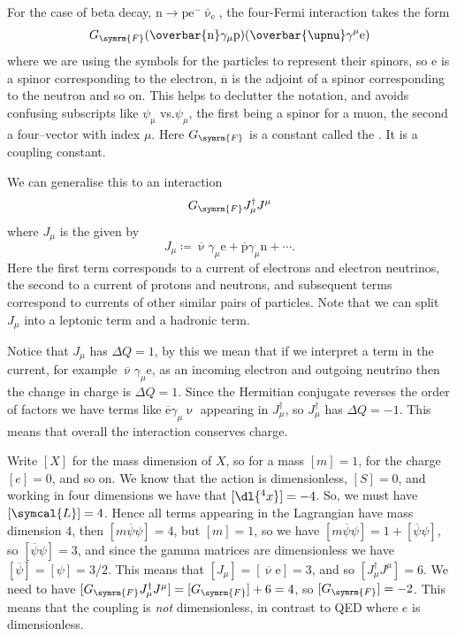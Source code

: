 \documentclass[fleqn]{NotesClass}
\newcommand{\Pparticle}[1]{\mathrm{#1}}
\newcommand{\Pe}{\ensuremath{\Pparticle{e}^{-}}}
\newcommand{\Pex}{\ensuremath{\Pparticle{e}}}
\newcommand{\Pmux}{\ensuremath{\upmu}}
\newcommand{\Pnu}{\ensuremath{\upnu}}
\newcommand{\Pp}{\ensuremath{\Pparticle{p}}}
\newcommand{\Pn}{\ensuremath{\Pparticle{n}}}
\newcommand{\APantiparticle}[1]{\bar{#1}}
\newcommand{\APnue}{\ensuremath{\APantiparticle{\upnu}_{\mathrm{e}}}}
\newcommand{\diracadjoint}[1]{\overbar{#1}}
\newcommand{\hermit}{\dagger}
\newcommand{\lagrangianDensity}{\symcal{L}}
\newcommand{\fermiConst}{G_{\symrm{F}}}
\begin{document}
   For the case of beta decay, \(\Pn \to \Pp \Pe \APnue\), the four-Fermi interaction takes the form
    \begin{equation}
        \fermiConst (\diracadjoint{\Pn} \gamma_\mu \Pp)(\diracadjoint{\Pnu} \gamma^\mu \Pex)
    \end{equation}
    where we are using the symbols for the particles to represent their spinors, so \(\Pex\) is a spinor corresponding to the electron, \(\diracadjoint{\Pn}\) is the adjoint of a spinor corresponding to the neutron and so on.
    This helps to declutter the notation, and avoids confusing subscripts like \(\psi_{\Pmux}\) vs.\@ \(\psi_{\mu}\), the first being a spinor for a muon, the second a four--vector with index \(\mu\).
    Here \(\fermiConst\) is a constant called the .
    It is a coupling constant.
    
    We can generalise this to an interaction
    \begin{equation}
        \fermiConst J_\mu^\hermit J^\mu
    \end{equation}
    where \(J_\mu\) is the  given by
    \begin{equation}
        J_\mu \coloneqq \diracadjoint{\Pnu} \gamma_\mu \Pex + \diracadjoint{\Pp} \gamma_\mu \Pn + \dotsb.
    \end{equation}
    Here the first term corresponds to a current of electrons and electron neutrinos, the second to a current of protons and neutrons, and subsequent terms correspond to currents of other similar pairs of particles.
    Note that we can split \(J_\mu\) into a leptonic term and a hadronic term.
    
    Notice that \(J_\mu\) has \(\Delta Q = 1\), by this we mean that if we interpret a term in the current, for example \(\diracadjoint{\Pnu} \gamma_\mu \Pex\), as an incoming electron and outgoing neutrino then the change in charge is \(\Delta Q = 1\).
    Since the Hermitian conjugate reverses the order of factors we have terms like \(\diracadjoint{\Pex} \gamma_\mu \Pnu\) appearing in \(J_\mu^\hermit\), so \(J_\mu^\hermit\) has \(\Delta Q = -1\).
    This means that overall the interaction conserves charge.
    
    Write \([X]\) for the mass dimension of \(X\), so for a mass \([m] = 1\), for the charge \([e] = 0\), and so on.
    We know that the action is dimensionless, \([S] = 0\), and working in four dimensions we have that \([\dl{^4x}] = -4\).
    So, we must have \([\lagrangianDensity] = 4\).
    Hence all terms appearing in the Lagrangian have mass dimension \(4\), then \([m\diracadjoint{\psi}\psi] = 4\), but \([m] = 1\), so we have \([m\diracadjoint{\psi}\psi] = 1 + [\diracadjoint{\psi}\psi]\), so \([\diracadjoint{\psi}\psi] = 3\), and since the gamma matrices are dimensionless we have \([\diracadjoint{\psi}] = [\psi] = 3/2\).
    This means that \([J_\mu] = [\diracadjoint{\Pnu}\Pex] = 3\), and so \([J_\mu^\hermit J^\mu] = 6\).
    We need to have \([\fermiConst J_\mu^\hermit J^\mu] = [\fermiConst] + 6 = 4\), so \([\fermiConst] = -2\).
    This means that the coupling is \emph{not} dimensionless, in contrast to QED where \(e\) is dimensionless.
    
\end{document}
